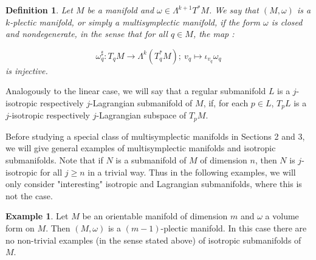 \documentclass[a4paper,12pt,leqno]{article}
\newtheorem{defa}{Definition}
\begin{document}
\begin{defa}
Let $M$ be a manifold and $\omega\in \Lambda^{k+1}T^*M$. We say that $(M,\omega)$ is a $k$-plectic manifold, 
or simply a multisymplectic manifold, if the form $\omega$ is closed and nondegenerate, in the sense that for all $q\in M$, the map :

\begin{equation*}
\omega_q^{\sharp}:T_qM\rightarrow \Lambda^k(T_q^*M); \ v_q\mapsto \iota_{v_q}\omega_q
\end{equation*}
is injective. 

\end{defa}


Analogously to the linear case, we will say that a regular submanifold $L$ is a $j$-isotropic respectively $j$-Lagrangian 
submanifold of $M$, if, for each $p\in L$, $T_pL$ is a $j$-isotropic respectively $j$-Lagrangian subspace 
of $T_pM$. \newline

Before studying a special class of multisymplectic manifolds in Sections 2 and 3, we will give general examples of 
multisymplectic manifolds and isotropic submanifolds. Note that if $N$ is a submanifold of $M$ of dimension $n$, then 
$N$ is $j$-isotropic for all $j\geq n$ in a trivial way. 
Thus in the following examples, we will only consider "interesting" isotropic and Lagrangian submanifolds, where this is not the case.\newline

\noindent \textbf{Example 1}. Let $M$ be an orientable manifold of dimension $m$ and $\omega$ a volume form on $M$. Then $(M,\omega)$ 
is a $(m{-}1)$-plectic manifold. In this case there are no non-trivial examples (in the sense stated above) of isotropic submanifolds of $M$. 
 \newline
\end{document}
